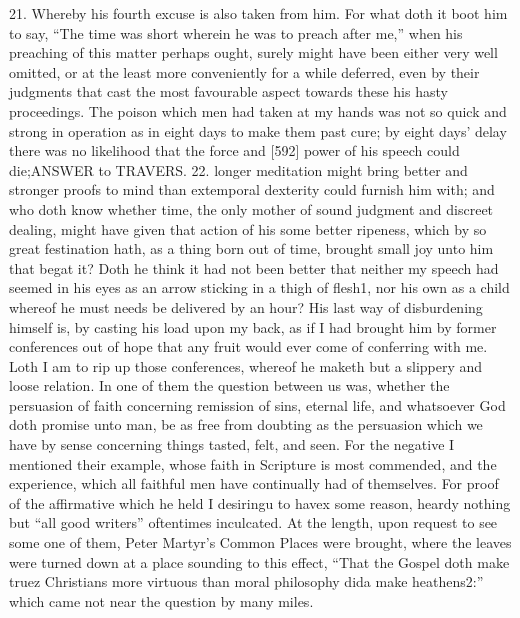 21. Whereby his fourth excuse is also taken from him. For what doth it boot him to say, “The time was short wherein he was to preach after me,” when his preaching of this matter perhaps ought, surely might have been either very well omitted, or at the least more conveniently for a while deferred, even by their judgments that cast the most favourable aspect towards these his hasty proceedings. The poison which men had taken at my hands was not so quick and strong in operation as in eight days to make them past cure; by eight days’ delay there was no likelihood that the force and [592] power of his speech could die;ANSWER to TRAVERS. 22. longer meditation might bring better and stronger proofs to mind than extemporal dexterity could furnish him with; and who doth know whether time, the only mother of sound judgment and discreet dealing, might have given that action of his some better ripeness, which by so great festination hath, as a thing born out of time, brought small joy unto him that begat it? Doth he think it had not been better that neither my speech had seemed in his eyes as an arrow sticking in a thigh of flesh1, nor his own as a child whereof he must needs be delivered by an hour? His last way of disburdening himself is, by casting his load upon my back, as if I had brought him by former conferences out of hope that any fruit would ever come of conferring with me. Loth I am to rip up those conferences, whereof he maketh but a slippery and loose relation. In one of them the question between us was, whether the persuasion of faith concerning remission of sins, eternal life, and whatsoever God doth promise unto man, be as free from doubting as the persuasion which we have by sense concerning things tasted, felt, and seen. For the negative I mentioned their example, whose faith in Scripture is most commended, and the experience, which all faithful men have continually had of themselves. For proof of the affirmative which he held I desiringu to havex some reason, heardy nothing but “all good writers” oftentimes inculcated. At the length, upon request to see some one of them, Peter Martyr’s Common Places were brought, where the leaves were turned down at a place sounding to this effect, “That the Gospel doth make truez Christians more virtuous than moral philosophy dida make heathens2:” which came not near the question by many miles.

